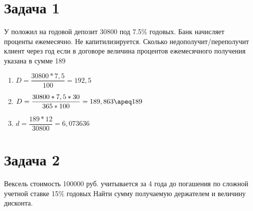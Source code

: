 \documentclass[11pt,a4paper]{article}
\begin{document}
  \section*{Задача 1}\label{sec:task-1}
  У положил на годовой депозит 30800  под 7.5\% годовых.
  Банк начисляет проценты ежемесячно.
  Не капитилизируется.
  Сколько недополучит/переполучит клиент через год если в договоре величина процентов ежемесячного получения указана
  в сумме 189 
  \newline


  \begin{enumerate}
    \item $D=\dfrac{30800*7,5}{100}=192,5$
    \item $D=\dfrac{30800*7,5*30}{365*100}=189,863\apeq189$
    \item $d=\dfrac{189*12}{30800}=6,073636$
  \end{enumerate}
  
  \section{Задача 2}\label{sec:task-2}
  Вексель стоимость 100000 руб.
  учитывается за 4 года до погашения по сложной учетной ставке 15\% годовых
  Найти сумму получаемую держателем и величину дисконта.
\end{document}
